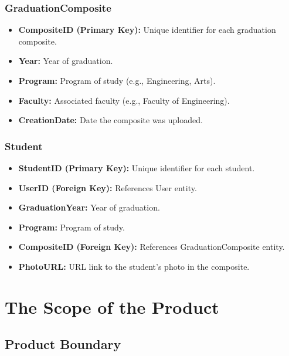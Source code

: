 \documentclass[12pt]{article}
\begin{document}
\subsubsection*{GraduationComposite}
\begin{itemize}
  \item \textbf{CompositeID (Primary Key):} Unique identifier for each graduation composite.
  \item \textbf{Year:} Year of graduation.
  \item \textbf{Program:} Program of study (e.g., Engineering, Arts).
  \item \textbf{Faculty:} Associated faculty (e.g., Faculty of Engineering).
  \item \textbf{CreationDate:} Date the composite was uploaded.
\end{itemize}

\subsubsection*{Student}
\begin{itemize}
  \item \textbf{StudentID (Primary Key):} Unique identifier for each student.
  \item \textbf{UserID (Foreign Key):} References User entity.
  \item \textbf{GraduationYear:} Year of graduation.
  \item \textbf{Program:} Program of study.
  \item \textbf{CompositeID (Foreign Key):} References GraduationComposite entity.
  \item \textbf{PhotoURL:} URL link to the student's photo in the composite.
\end{itemize}

\section{The Scope of the Product}

\subsection{Product Boundary}
\end{document}
